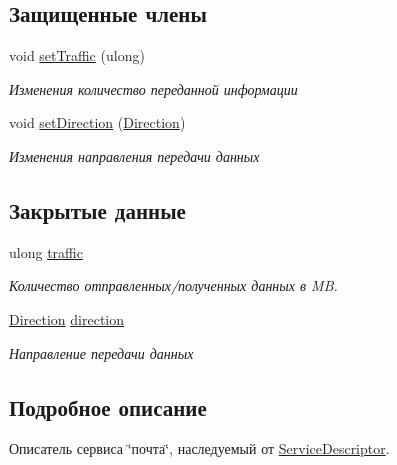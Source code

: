 \subsection*{Защищенные члены}
\begin{DoxyCompactItemize}
\item 
void \hyperlink{class_network_service_1_1_post_descriptor_a5e3e03cbe0e31397bed9e17428348bd1}{set\+Traffic} (ulong)
\begin{DoxyCompactList}\small\item\em Изменения количество переданной информации \end{DoxyCompactList}\item 
void \hyperlink{class_network_service_1_1_post_descriptor_ab976b83349507b5e6841fcbc2ddc9edd}{set\+Direction} (\hyperlink{namespace_network_service_abe1196dad9e8afcbc5c6b38196ce2c65}{Direction})
\begin{DoxyCompactList}\small\item\em Изменения направления передачи данных \end{DoxyCompactList}\end{DoxyCompactItemize}
\subsection*{Закрытые данные}
\begin{DoxyCompactItemize}
\item 
ulong \hyperlink{class_network_service_1_1_post_descriptor_ae2eef559828a42ec299ab59711f88e59}{traffic}
\begin{DoxyCompactList}\small\item\em Количество отправленных/полученных данных в M\+B. \end{DoxyCompactList}\item 
\hyperlink{namespace_network_service_abe1196dad9e8afcbc5c6b38196ce2c65}{Direction} \hyperlink{class_network_service_1_1_post_descriptor_a04faf66e747b2d4f2d89bf1e92f4ab5c}{direction}
\begin{DoxyCompactList}\small\item\em Направление передачи данных \end{DoxyCompactList}\end{DoxyCompactItemize}


\subsection{Подробное описание}
Описатель сервиса \char`\"{}почта\char`\"{}, наследуемый от \hyperlink{class_network_service_1_1_service_descriptor}{Service\+Descriptor}. 

